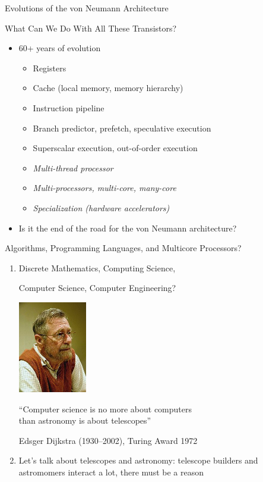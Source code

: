 \documentclass[xcolor=dvipsnames,9pt,mathserif]{beamer}
\renewcommand{\emph}[1]{\alert{#1}}
\begin{document}
\begin{frame}{Evolutions of the von Neumann Architecture}
  \begin{block}{What Can We Do With All These Transistors?}
    \begin{itemize}
    \item 60+ years of evolution
      \begin{itemize}
      \item Registers
      \item Cache (local memory, memory hierarchy)
      \item Instruction pipeline
      \item Branch predictor, prefetch, speculative execution
      \item Superscalar execution, out-of-order execution

        \medskip
      \item<2-> \slshape Multi-thread processor
      \item<2-> \slshape Multi-processors, multi-core, many-core
      \item<2-> \slshape Specialization (hardware accelerators)
      \end{itemize}
    \item<3> Is it the end of the road for the von Neumann architecture?
    \end{itemize}
  \end{block}
\end{frame}

\begin{frame}{Algorithms, Programming Languages, and Multicore Processors?}
  \begin{enumerate}
  \item Discrete Mathematics, Computing Science,

    Computer Science, Computer Engineering?

    \vskip-1cm
    \hfill\includegraphics[width=3cm]{dijkstra.jpg}
    
    \begin{center}
      \emph{``Computer science is no more about computers \\
        than astronomy is about telescopes''}

      \medskip
      Edsger Dijkstra (1930--2002), Turing Award 1972
    \end{center}
  \item Let's talk about \emph{telescopes and astronomy}: telescope
    builders and astromomers interact a lot, there must be a reason
  \end{enumerate}
\end{frame}
\end{document}
